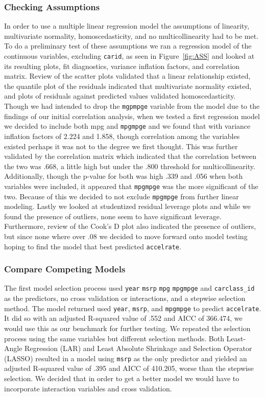 \documentclass[acmsmall]{acmart}
\begin{document}
\subsubsection{Checking Assumptions}
In order to use a multiple linear regression model the assumptions of linearity, multivariate normality, homoscedasticity, and no multicollinearity had to be met. To do a preliminary test of these assumptions we ran a regression model of the continuous variables, excluding \texttt{carid}, as seen in Figure~\ref{fig:ASS} and looked at its resulting plots, fit diagnostics, variance inflation factors, and correlation matrix.  Review of the scatter plots validated that a linear relationship existed, the quantile plot of the residuals indicated that multivariate normality existed, and plots of residuals against predicted values validated homoscedasticity. Though we had intended to drop the \texttt{mgpmpge} variable from the model due to the findings of our initial correlation analysis, when we tested a first regression model we decided to include both mpg and \texttt{mpgmpge} and we found that with variance inflation factors of 2.224 and 1.858, though correlation among the variables existed perhaps it was not to the degree we first thought. This was further validated by the correlation matrix which indicated that the correlation between the two was .668, a little high but under the .800 threshold for multicollinearity. Additionally, though the p-value for both was high .339 and .056 when both variables were included, it appeared that \texttt{mpgmpge} was the more significant of the two. Because of this we decided to not exclude \texttt{mpgmpge} from further linear modeling. Lastly we looked at studentized residual leverage plots and while we found the presence of outliers, none seem to have significant leverage. Furthermore, review of the Cook’s D plot also indicated the presence of outliers, but since none where over .08 we decided to move forward onto model testing hoping to find the model that best predicted \texttt{accelrate}.\\
\subsubsection{Compare Competing Models}
The first model selection process used \texttt{year} \texttt{msrp} \texttt{mpg} \texttt{mpgmpge} and \texttt{carclass\_id} as the predictors, no cross validation or interactions, and a stepwise selection method. The model returned used \texttt{year}, \texttt{msrp}, and \texttt{mpgmpge} to predict \texttt{accelrate}. It did so with an adjusted R-squared value of .552 and AICC of 366.474, we would use this as our benchmark for further testing. We repeated the selection process using the same variables but different selection methods. Both Least-Angle Regression (LAR) and Least Absolute Shrinkage and Selection Operator (LASSO) resulted in a model using \texttt{msrp} as the only predictor and yielded an adjusted R-squared value of .395 and AICC of 410.205, worse than the stepwise selection. We decided that in order to get a better model we would have to incorporate interaction variables and cross validation.\\
\end{document}
